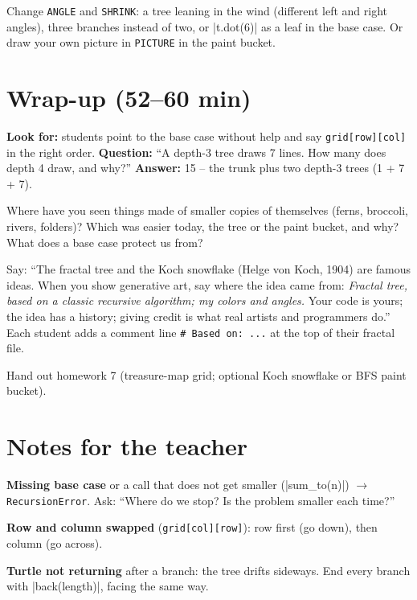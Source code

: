 \begin{freebuild}
Change \texttt{ANGLE} and \texttt{SHRINK}: a tree leaning in the wind (different left and right angles), three branches instead of two, or \py|t.dot(6)| as a leaf in the base case. Or draw your own picture in \texttt{PICTURE} in the paint bucket.
\end{freebuild}

\section{Wrap-up (52--60 min)}
\begin{formativecheck}
\textbf{Look for:} students point to the base case without help and say \texttt{grid[row][col]} in the right order.
\textbf{Question:} \enquote{A depth-3 tree draws 7 lines. How many does depth 4 draw, and why?}
\textbf{Answer:} 15 -- the trunk plus two depth-3 trees (1 + 7 + 7).
\end{formativecheck}

\begin{reflection}
Where have you seen things made of smaller copies of themselves (ferns, broccoli, rivers, folders)? Which was easier today, the tree or the paint bucket, and why? What does a base case protect us from?
\end{reflection}

\begin{safety}
Say: \enquote{The fractal tree and the Koch snowflake (Helge von Koch, 1904) are famous ideas. When you show generative art, say where the idea came from: \emph{Fractal tree, based on a classic recursive algorithm; my colors and angles.} Your code is yours; the idea has a history; giving credit is what real artists and programmers do.} Each student adds a comment line \texttt{\# Based on: ...} at the top of their fractal file.
\end{safety}

Hand out homework 7 (treasure-map grid; optional Koch snowflake or BFS paint bucket).

\section{Notes for the teacher}
\begin{commonmistakes}
  \item \textbf{Missing base case} or a call that does not get smaller (\py|sum_to(n)|) $\rightarrow$ \texttt{RecursionError}. Ask: \enquote{Where do we stop? Is the problem smaller each time?}
  \item \textbf{Row and column swapped} (\texttt{grid[col][row]}): row first (go down), then column (go across).
  \item \textbf{Turtle not returning} after a branch: the tree drifts sideways. End every branch with \py|back(length)|, facing the same way.
\end{commonmistakes}

